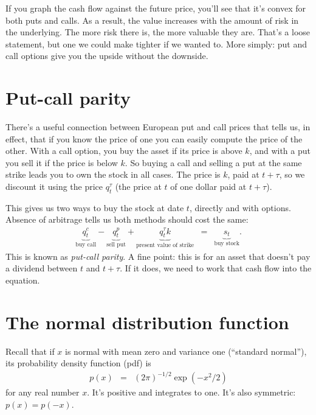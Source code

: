 \documentclass[11pt]{article}
\begin{document}
If you graph the cash flow against the future price, you'll see
that it's convex for both puts and calls.
As a result, the value increases with the amount
of risk in the underlying.
The more risk there is, the more valuable they are.
That's a loose statement, but one we could make tighter if we wanted to.
More simply:  put and call options give you the upside
without the downside.


\section{Put-call parity}


There's a useful connection between European put and call prices
that tells us, in effect, that if you know the price of one you can
easily compute the price of the other.
With a call option, you buy the asset if its price is above $k$,
and with a put you sell it if the price is below $k$.
So buying a call and selling a put at the same strike leads you to own the stock in all cases.
The price is $k$, paid at $t+\tau$, so we discount it using
the price $q^\tau_t$ (the price at $t$ of one dollar paid at $t+\tau$).

This gives us two ways to buy the stock at date $t$,
directly and with options.
Absence of arbitrage tells us both methods should cost the same:
\begin{eqnarray}
    \underbrace{q^c_t}_{\mbox{buy call}} -
    \underbrace{q^p_t}_{\mbox{sell put}} +
    \underbrace{q^\tau_t k}_{\mbox{present value of strike}}
    &=&
    \underbrace{s_t}_{\mbox{buy stock}} .
    \label{eq:put-call-parity}
\end{eqnarray}
This is known as {\it put-call parity\/}.
A fine point:  this is for an asset that doesn't pay a dividend
between $t$ and $t+\tau$.
If it does, we need to work that cash flow into the equation.


\section{The normal distribution function}


Recall that if $x$ is normal with mean zero and variance one (``standard normal''),
its probability density function (pdf) is
\begin{eqnarray*}
    p(x) &=& (2 \pi)^{-1/2} \exp(-x^2/2)
\end{eqnarray*}
for any real number $x$.
It's positive and integrates to one.
It's also symmetric:  $p(x) = p(-x)$.
\end{document}
